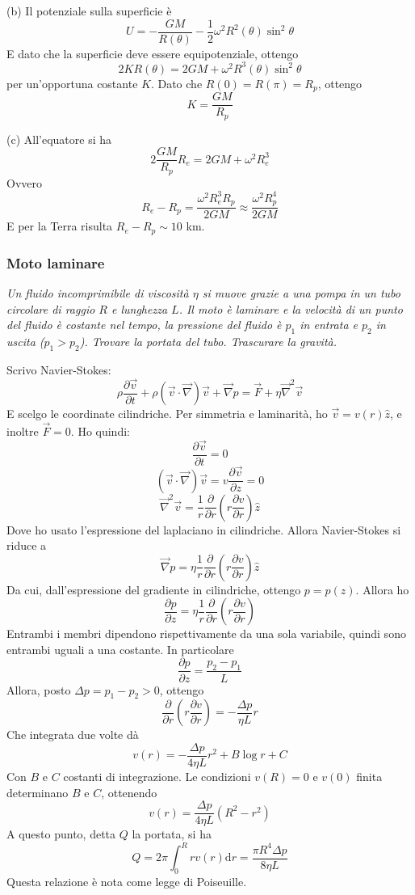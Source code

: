\documentclass[a4paper,11pt]{article}
\begin{document}
\noindent (b) Il potenziale sulla superficie è
\[U=-\frac{GM}{R(\theta)}-\frac{1}{2}\omega^2R^2(\theta)\sin^2\theta\]
E dato che la superficie deve essere equipotenziale, ottengo
\[2KR(\theta)=2GM+\omega^2R^3(\theta)\sin^2\theta\]
per un'opportuna costante $K$. Dato che $R(0)=R(\pi)=R_p$, ottengo
\[K=\frac{GM}{R_p}\]

\noindent (c) All'equatore si ha
\[2\frac{GM}{R_p}R_e=2GM+\omega^2R_e^3\]
Ovvero
\[R_e-R_p=\frac{\omega^2R_e^3R_p}{2GM}\approx\frac{\omega^2R_p^4}{2GM}\]
E per la Terra risulta $R_e-R_p\sim 10$ km.

\subsubsection{Moto laminare}
\textit{Un fluido incomprimibile di viscosità $\eta$ si muove grazie a una pompa in un tubo circolare di raggio $R$ e lunghezza $L$. Il moto è laminare e la velocità di un punto del fluido è costante nel tempo, la pressione del fluido è $p_1$ in entrata e $p_2$ in uscita ($p_1>p_2$). Trovare la portata del tubo. Trascurare la gravità.}
\vspace{5mm}

\noindent Scrivo Navier-Stokes:
\[\rho\frac{\partial\vec{v}}{\partial t}+\rho\left(\vec{v}\cdot\vec{\nabla}\right)\vec{v}+\vec{\nabla}p=\vec{F}+\eta\vec{\nabla}^2\vec{v}\]
E scelgo le coordinate cilindriche. Per simmetria e laminarità, ho $\vec{v}=v(r)\hat{z}$, e inoltre $\vec{F}=0$. Ho quindi:
\[\frac{\partial \vec{v}}{\partial t}=0\]
\[\left(\vec{v}\cdot\vec{\nabla}\right)\vec{v}=v\frac{\partial\vec{v}}{\partial z}=0\]
\[\vec{\nabla}^2\vec{v}=\frac{1}{r}\frac{\partial}{\partial r}\left(r\frac{\partial v}{\partial r}\right)\hat{z}\]
Dove ho usato l'espressione del laplaciano in cilindriche. Allora Navier-Stokes si riduce a 
\[\vec{\nabla}p=\eta\frac{1}{r}\frac{\partial}{\partial r}\left(r\frac{\partial v}{\partial r}\right)\hat{z}\]
Da cui, dall'espressione del gradiente in cilindriche, ottengo $p=p(z)$. Allora ho
\[\frac{\partial p}{\partial z}=\eta\frac{1}{r}\frac{\partial}{\partial r}\left(r\frac{\partial v}{\partial r}\right)\]
Entrambi i membri dipendono rispettivamente da una sola variabile, quindi sono entrambi uguali a una costante. In particolare
\[\frac{\partial p}{\partial z}=\frac{p_2-p_1}{L}\]
Allora, posto $\Delta p=p_1-p_2>0$, ottengo
\[\frac{\partial}{\partial r}\left(r\frac{\partial v}{\partial r}\right)=-\frac{\Delta p}{\eta L}r\]
Che integrata due volte dà
\[v(r)=-\frac{\Delta p}{4\eta L}r^2+B\log r+C\]
Con $B$ e $C$ costanti di integrazione. Le condizioni $v(R)=0$ e $v(0)$ finita determinano $B$ e $C$, ottenendo
\[v(r)=\frac{\Delta p}{4\eta L}\left(R^2-r^2\right)\]
A questo punto, detta $Q$ la portata, si ha
\[Q=2\pi\int_{0}^{R}rv(r)\mathrm{d}r=\frac{\pi R^4\Delta p}{8\eta L}\]
Questa relazione è nota come legge di Poiseuille.
\end{document}

